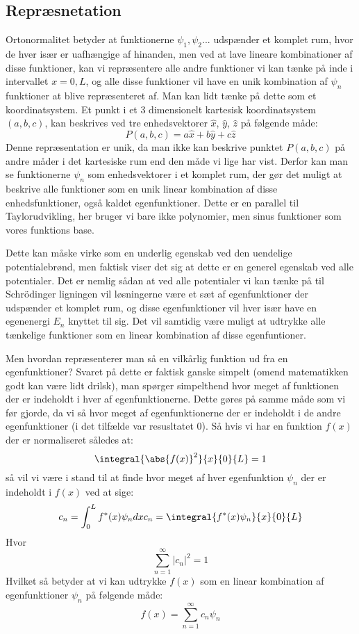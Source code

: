 \subsection{Repræsnetation}
Ortonormalitet betyder at funktionerne $\psi_1, \psi_2...$ udspænder et komplet rum, hvor de hver især er uafhængige af hinanden, men ved at lave lineare kombinationer af disse funktioner, kan vi repræsentere alle andre funktioner vi kan tænke på inde i intervallet $x=0,L$, og alle disse funktioner vil have en unik kombination af $\psi_n$ funktioner at blive repræsenteret af. Man kan lidt tænke på dette som et koordinatsystem. Et punkt i et 3 dimensionelt kartesisk koordinatsystem $(a,b,c)$, kan beskrives ved tre enhedsvektorer $\hat{x}$, $\hat{y}$, $\hat{z}$ på følgende måde:
\begin{equation*}
    P(a,b,c)=a\hat{x}+b\hat{y}+c\hat{z}
\end{equation*}
Denne repræsentation er unik, da man ikke kan beskrive punktet $P(a,b,c)$ på andre måder i det kartesiske rum end den måde vi lige har vist. Derfor kan man se funktionerne $\psi_n$ som enhedsvektorer i et komplet rum, der gør det muligt at beskrive alle funktioner som en unik linear kombination af disse enhedsfunktioner, også kaldet egenfunktioner. Dette er en parallel til Taylorudvikling, her bruger vi bare ikke polynomier, men sinus funktioner som vores funktions base.

Dette kan måske virke som en underlig egenskab ved den uendelige potentialebrønd, men faktisk viser det sig at dette er en generel egenskab ved alle potentialer. Det er nemlig sådan at ved alle potentialer vi kan tænke på til Schrödinger ligningen vil løsningerne være et sæt af egenfunktioner der udspænder et komplet rum, og disse egenfunktioner vil hver især have en egenenergi $E_n$ knyttet til sig. Det vil samtidig være muligt at udtrykke alle tænkelige funktioner som en linear kombination af disse egenfuntioner. 

Men hvordan repræsenterer man så en vilkårlig funktion ud fra en egenfunktioner? Svaret på dette er faktisk ganske simpelt (omend matematikken godt kan være lidt drilsk), man spørger simpelthend hvor meget af funktionen der er indeholdt i hver af egenfunktionerne. Dette gøres på samme måde som vi før gjorde, da vi så hvor meget af egenfunktionerne der er indeholdt i de andre egenfunktioner (i det tilfælde var resusltatet 0). Så hvis vi har en funktion $f(x)$ der er normaliseret således at:
\begin{equation*}
    \integral{\abs{f(x)}^2}{x}{0}{L} = 1
\end{equation*}
så vil vi være i stand til at finde hvor meget af hver egenfunktion $\psi_n$ der er indeholdt i $f(x)$ ved at sige:
\begin{equation}
c_n=\int_{0}^{L}f^*(x)\psi_n dx  
c_n= \integral{f^*(x)\psi_n}{x}{0}{L}  
\end{equation}
Hvor
\begin{equation*}
    \sum_{n=1}^{\infty}|c_n|^2=1
\end{equation*}
Hvilket så betyder at vi kan udtrykke $f(x)$ som en linear kombination af egenfunktioner $\psi_n$ på følgende måde:
\begin{equation}
    f(x)=\sum_{n=1}^{\infty}c_{n}\psi_{n}
\end{equation}
